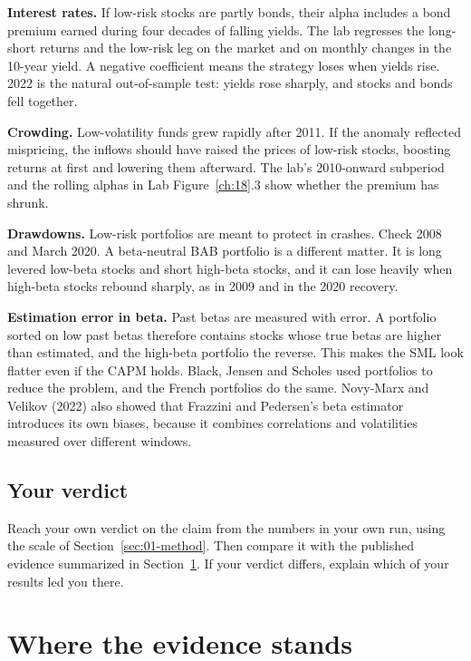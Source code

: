 \textbf{Interest rates.} If low-risk stocks are partly bonds, their alpha includes a bond premium earned during four decades of falling yields. The lab regresses the long-short returns and the low-risk leg on the market and on monthly changes in the 10-year yield. A negative coefficient means the strategy loses when yields rise. 2022 is the natural out-of-sample test: yields rose sharply, and stocks and bonds fell together.

\textbf{Crowding.} Low-volatility funds grew rapidly after 2011. If the anomaly reflected mispricing, the inflows should have raised the prices of low-risk stocks, boosting returns at first and lowering them afterward. The lab's 2010-onward subperiod and the rolling alphas in Lab Figure~\ref{ch:18}.3 show whether the premium has shrunk.

\textbf{Drawdowns.} Low-risk portfolios are meant to protect in crashes. Check 2008 and March 2020. A beta-neutral BAB portfolio is a different matter. It is long levered low-beta stocks and short high-beta stocks, and it can lose heavily when high-beta stocks rebound sharply, as in 2009 and in the 2020 recovery.

\textbf{Estimation error in beta.} Past betas are measured with error. A portfolio sorted on low past betas therefore contains stocks whose true betas are higher than estimated, and the high-beta portfolio the reverse. This makes the SML look flatter even if the CAPM holds. Black, Jensen and Scholes used portfolios to reduce the problem, and the French portfolios do the same. Novy-Marx and Velikov (2022) also showed that Frazzini and Pedersen's beta estimator introduces its own biases, because it combines correlations and volatilities measured over different windows.

\subsection*{Your verdict}

Reach your own verdict on the claim from the numbers in your own run, using the scale of Section~\ref{sec:01-method}. Then compare it with the published evidence summarized in Section~\ref{sec:18-verdict}. If your verdict differs, explain which of your results led you there.

\section{Where the evidence stands}
\label{sec:18-verdict}

